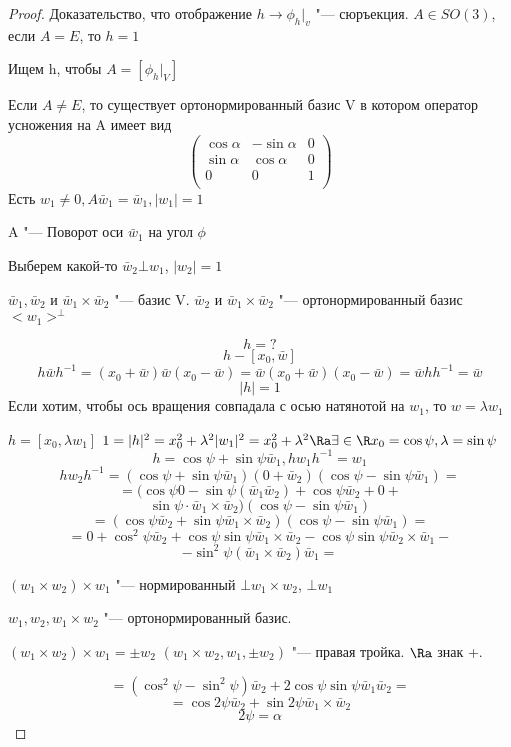 \begin{proof}
Доказательство, что отображение $h \to \phi_h|_{v}$  "--- сюръекция. 
$A \in SO(3)$, если $A = E$, то $h = 1$

Ищем h, чтобы $A = [\phi_h|_V]$

Если $A \ne E$, то существует ортонормированный базис V в котором оператор усножения на A имеет вид
$$
\begin{pmatrix}
\cos \alpha & - \sin \alpha & 0\\
\sin \alpha & \cos\alpha & 0\\
0 & 0 & 1\\
\end{pmatrix}
$$
Есть $w_1 \ne 0, A\bar w_1 = \bar w_1, |w_1| = 1$

A "--- Поворот оси $\bar w_1$  на угол $\phi$

Выберем какой-то $\bar w_2 \bot w_1$, $|w_2| = 1$

$\bar w_1, \bar w_2$ и $\bar w_1 \times \bar w_2$ "--- базис V.
$\bar w_2$ и $\bar w_1 \times \bar w_2$ "--- ортонормированный базис $<w_1>^{\bot}$

$$h = ?$$
$$h - [x_0, \bar w]$$
$$h \bar w h^{-1} = (x_0 + \bar w)\bar w(x_0 - \bar w) = \bar w(x_0 + \bar w)(x_0 - \bar w) = \bar w h h^{-1} = \bar w$$
$$|h| = 1$$
Если хотим, чтобы ось вращения совпадала с осью натянотой на $w_1$, то $w = \lambda w_1$

$h = [x_0, \lambda w_1]$
$1 = |h|^2 = x_0^2 + \lambda^2|w_1|^2 = x_0^2 + \lambda^2  \Ra \exists \in \R x_0 = \cos \psi, \lambda = \sin \psi$
$$h = \cos \psi + \sin \psi \bar w_1, hw_1h^{-1} = w_1$$
$$hw_2h^{-1} = (\cos \psi  + \sin \psi \bar w_1 )(0 + \bar w_2)(\cos \psi - \sin \psi \bar w_1) = $$
$$= (\cos \psi 0 - \sin \psi (\bar w_1 \bar w_2) + \cos \psi \bar w_2 + 0 + $$
$$\sin \psi \cdot \bar w_1 \times \bar w_2)(\cos \psi - \sin \psi \bar w_1)$$
$$= (\cos \psi \bar w_2 + \sin \psi \bar w_1 \times \bar w_2)(\cos \psi - \sin \psi \bar w_1) = $$
$$= 0 + \cos^2 \psi \bar w_2 + \cos \psi \sin \psi \bar w_1 \times \bar w_2 - \cos \psi \sin \psi \bar w_2 \times \bar w_1 - $$
$$- \sin^2 \psi(\bar w_1 \times \bar w_2) \bar w_1 = $$

$(w_1 \times w_2) \times w_1$ "--- нормированный $\bot w_1 \times w_2$, $\bot w_1$

$w_1, w_2, w_1 \times w_2$ "--- ортонормированный базис. 

$(w_1 \times w_2) \times w_1 = \pm w_2$
$(w_1 \times w_2, w_1, \pm w_2)$ "--- правая тройка. $\Ra$ знак +.  

$$= (\cos^2 \psi - \sin^2 \psi)\bar w_2 + 2 \cos \psi \sin \psi \bar w_1 \bar w_2 =  $$
$$= \cos 2 \psi \bar w_2 + \sin 2 \psi \bar w_1 \times \bar w_2$$
$$2 \psi = \alpha$$

\end{proof}

